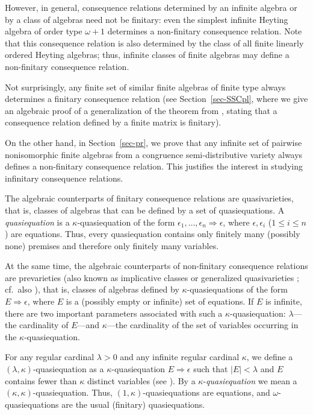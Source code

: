 \documentclass[submission,copyright,creativecommons]{eptcs}
\theoremstyle{definition}
\newcommand{\ee}{\epsilon}
\newcommand{\Def}[1]{\textit{#1}}
\newcommand{\kk}{\kappa}
\newcommand{\lm}{\lambda}
\newcommand{\Ra}{\Rightarrow}
\begin{document}
However, in general, consequence relations determined by an infinite algebra or by a class of algebras need not be finitary: even the simplest infinite Heyting algebra of order type $\omega + 1$ determines a non-finitary consequence relation. Note that this consequence relation is also determined by the class of all finite linearly ordered Heyting algebras; thus, infinite classes of finite algebras may define a non-finitary consequence relation.

Not surprisingly, any finite set of similar finite algebras of finite type always determines a finitary consequence relation (see Section~\ref{sec-SSCpl}, where we give an algebraic proof of a generalization of the theorem from \cite[Section~8]{LosSuszkoRemarks1958}, stating that a consequence relation defined by a finite matrix is finitary).

On the other hand, in Section~\ref{sec-pr}, we prove that any infinite set of pairwise nonisomorphic finite algebras from a congruence semi-distributive variety always defines a non-finitary consequence relation. This justifies the interest in studying infinitary consequence relations.

The algebraic counterparts of finitary consequence relations are quasivarieties, that is, classes of algebras that can be defined by a set of quasiequations. A \Def{quasiequation} is a $\kk$-quasiequation of the form $\ee_1, \dots, \ee_n \Ra \ee$, where $\ee, \ee_i$ ($1 \leq i \leq n$) are equations. Thus, every quasiequation contains only finitely many (possibly none) premises and therefore only finitely many variables.

At the same time, the algebraic counterparts of non-finitary consequence relations are prevarieties (also known as implicative classes \cite{ShafaatImplicationally1969} or generalized quasivarieties \cite{MoraschiniLogical2018}; cf.\ also \cite{BlokJonsson1999}), that is, classes of algebras defined by $\kk$-quasiequations of the form $E \Ra \ee$, where $E$ is a (possibly empty or infinite) set of equations. If $E$ is infinite, there are two important parameters associated with such a $\kk$-quasiequation: $\lm$—the cardinality of $E$—and $\kk$—the cardinality of the set of variables occurring in the $\kk$-quasiequation.

For any regular cardinal $\lm > 0$ and any infinite regular cardinal $\kk$, we define a $(\lm,\kk)$-quasiequation as a $\kk$-quasiequation $E \Ra \ee$ such that $|E| < \lm$ and $E$ contains fewer than $\kk$ distinct variables (see \cite[Section~2.3.4]{GorbunovBookE}). By a $\kk$-\Def{quasiequation} we mean a $(\kk,\kk)$-quasiequation. Thus, $(1,\kk)$-quasiequations are equations, and $\omega$-quasiequations are the usual (finitary) quasiequations.
\end{document}

